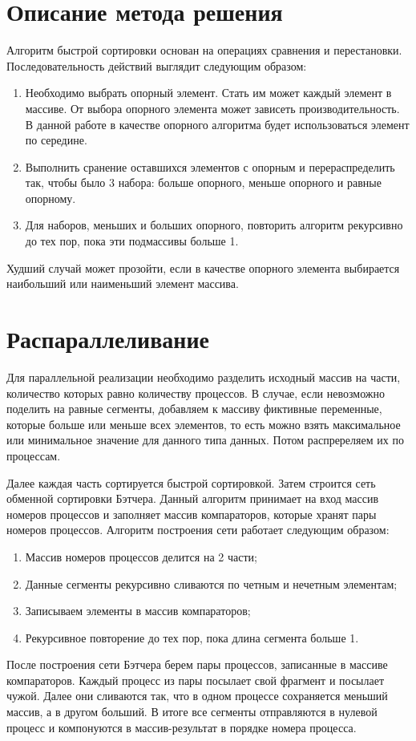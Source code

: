 \documentclass{report}
\begin{document}
\section*{Описание метода решения}
Алгоритм быстрой сортировки основан на операциях сравнения и перестановки. Последовательность действий выглядит следующим образом:
\begin{enumerate}
\item	Необходимо выбрать опорный элемент. Стать им может каждый элемент в массиве. От выбора опорного элемента может зависеть производительность. В данной работе в качестве опорного алгоритма будет использоваться элемент по середине.
\item Выполнить сранение оставшихся элементов с опорным и перераспределить так, чтобы было 3 набора: больше опорного, меньше опорного и равные опорному.
\item Для наборов, меньших и больших опорного, повторить алгоритм рекурсивно до тех пор, пока эти подмассивы больше 1.
\end{enumerate}
\par Худший случай может прозойти, если в качестве опорного элемента выбирается наибольший или наименьший элемент массива.
\newpage

\section*{Распараллеливание}
Для параллельной реализации необходимо разделить исходный массив на части, количество которых равно количеству процессов. В случае, если невозможно поделить на равные сегменты, добавляем к массиву фиктивные переменные, которые больше или меньше всех элементов, то есть можно взять максимальное или минимальное значение для данного типа данных. Потом распререляем их по процессам.
\par Далее каждая часть сортируется быстрой сортировкой. Затем строится сеть обменной сортировки Бэтчера. Данный алгоритм принимает на вход массив номеров процессов и заполняет массив компараторов, которые хранят пары номеров процессов. Алгоритм построения сети работает следующим образом:
\begin{enumerate}
\item Массив номеров процессов делится на 2 части;
\item Данные сегменты рекурсивно сливаются  по четным и нечетным элементам;
\item Записываем элементы в массив компараторов;
\item Рекурсивное повторение до тех пор, пока длина сегмента больше 1.
\end{enumerate}
\par После построения сети Бэтчера берем пары процессов, записанные в массиве компараторов. Каждый процесс из пары посылает свой фрагмент и посылает чужой. Далее они сливаются так, что в одном процессе сохраняется меньший массив, а в другом больший. В итоге все сегменты отправляются в нулевой процесс и компонуются в массив-результат в порядке номера процесса.
\end{document}
